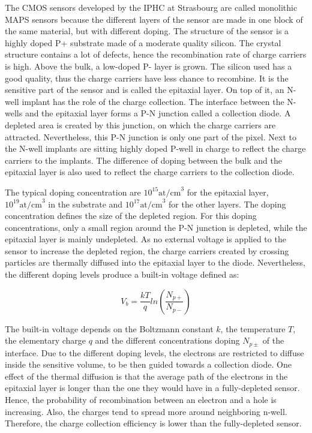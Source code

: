     The \gls{CMOS} sensors developed by the IPHC at Strasbourg are called monolithic \gls{MAPS} sensors because the different layers of the sensor are made in one block of the same material, but with different doping.
    The structure of the sensor is a highly doped P+ substrate made of a moderate quality silicon. 
    The crystal structure contains a lot of defects, hence the recombination rate of charge carriers is high.
    Above the bulk, a low-doped P- layer is grown.
    The silicon used has a good quality, thus the charge carriers have less chance to recombine.
    It is the sensitive part of the sensor and is called the epitaxial layer. 
    On top of it, an N-well implant has the role of the charge collection.
    The interface between the N-wells and the epitaxial layer forms a P-N junction called a collection diode.
    A depleted area is created by this junction, on which the charge carriers are attracted.
    Nevertheless, this P-N junction is only one part of the pixel.
    Next to the N-well implants are sitting highly doped P-well in charge to reflect the charge carriers to the implants.
    The difference of doping between the bulk and the epitaxial layer is also used to reflect the charge carriers to the collection diode.

    The typical doping concentration are $10^{15} \text{at/cm}^3$ for the epitaxial layer, $10^{19} \text{at/cm}^3$ in the substrate and $10^{17} \text{at/cm}^3$ for the other layers.
    The doping concentration defines the size of the depleted region.
    For this doping concentrations, only a small region around the P-N junction is depleted, while the epitaxial layer is mainly undepleted. 
    As no external voltage is applied to the sensor to increase the depleted region, the charge carriers created by crossing particles are thermally diffused into the epitaxial layer to the diode.
    Nevertheless, the different doping levels produce a built-in voltage defined as: 

    \begin{equation}
      V_b = \frac{kT}{q}ln\left( \frac{N_{p+}}{N_{p-}}\right)
    \end{equation}
    
    The built-in voltage depends on the Boltzmann constant $k$, the temperature $T$, the elementary charge $q$ and the different concentrations doping $N_{p\pm}$ of the interface.
    Due to the different doping levels, the electrons are restricted to diffuse inside the sensitive volume, to be then guided towards a collection diode.
    One effect of the thermal diffusion is that the average path of the electrons in the epitaxial layer is longer than the one they would have in a fully-depleted sensor.
    Hence, the probability of recombination between an electron and a hole is increasing.
    Also, the charges tend to spread more around neighboring n-well.
    Therefore, the charge collection efficiency is lower than the fully-depleted sensor.

